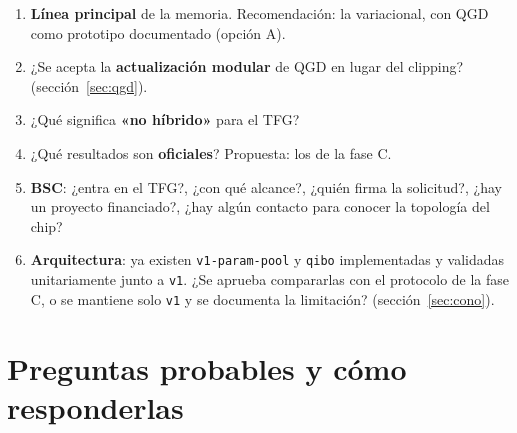 \documentclass[11pt,a4paper]{article}
\begin{document}
\begin{enumerate}
  \item \textbf{Línea principal} de la memoria. Recomendación: la variacional, con QGD como prototipo documentado (opción A).
  \item ¿Se acepta la \textbf{actualización modular} de QGD en lugar del clipping? (sección~\ref{sec:qgd}).
  \item ¿Qué significa \textbf{«no híbrido»} para el TFG?
  \item ¿Qué resultados son \textbf{oficiales}? Propuesta: los de la fase C.
  \item \textbf{BSC}: ¿entra en el TFG?, ¿con qué alcance?, ¿quién firma la solicitud?, ¿hay un proyecto financiado?,
        ¿hay algún contacto para conocer la topología del chip?
  \item \textbf{Arquitectura}: ya existen \texttt{v1-param-pool} y \texttt{qibo} implementadas y validadas unitariamente
        junto a \texttt{v1}. ¿Se aprueba compararlas con el protocolo de la fase C, o se mantiene solo \texttt{v1} y se
        documenta la limitación? (sección~\ref{sec:cono}).
\end{enumerate}

\section{Preguntas probables y cómo responderlas}
\end{document}
